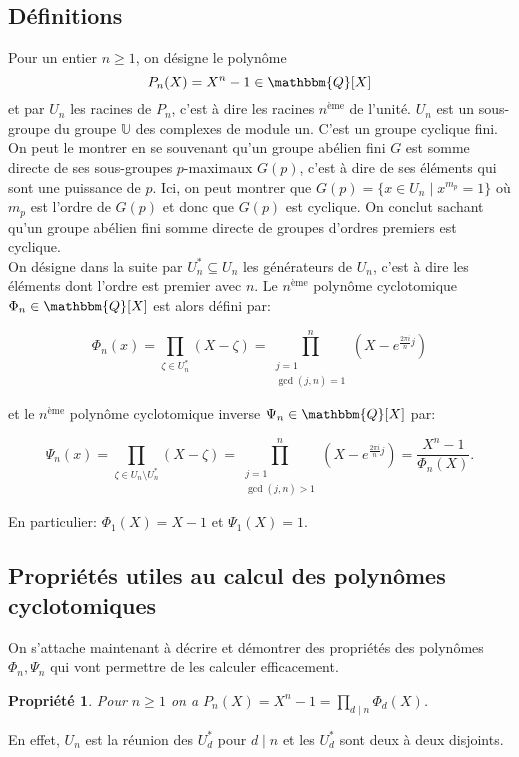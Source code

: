 \documentclass{article}
\newcommand{\Q}{\mathbbm{Q}}
\theoremstyle{break}                  %
\newtheorem{propriete}{Propriété}
\begin{document}
\subsection*{Définitions}
Pour un entier $n \ge 1$, on désigne le polynôme $$P_n(X) = X^n - 1 \in \Q[X]$$ et par $U_n$ les racines de $P_n$, c'est à dire les racines $n^{\text{ème}}$ de l'unité. $U_n$ est un sous-groupe du groupe $\mathbb U$ des complexes de module un. C'est un groupe cyclique fini. On peut le montrer en se souvenant qu'un groupe abélien fini $G$ est somme directe de ses sous-groupes $p$-maximaux $G(p)$, c'est à dire de ses éléments qui sont une puissance de $p$. Ici, on peut montrer que $G(p) = \{x \in U_n \mid x^{m_p} = 1\}$ où $m_p$ est l'ordre de $G(p)$ et donc que $G(p)$ est cyclique. On conclut sachant qu'un groupe abélien fini somme directe de groupes d'ordres premiers est cyclique.\\


On désigne dans la suite par $U_n^* \subseteq U_n$ les générateurs de $U_n$, c'est à dire les éléments dont l'ordre est premier avec $n$. Le $n^{\text{ème}}$ polynôme cyclotomique $\Phi_n \in \Q[X]$ est alors défini par:

$$\Phi_n(x) = \prod_{\zeta \in U^*_n} (X - \zeta) = \prod_{\substack{j=1\\ \gcd(j,n)=1}}^n (X - e^{\frac{2 \pi i}{n}j})$$

et le $n^{\text{ème}}$ polynôme cyclotomique inverse $\Psi_n \in \Q[X]$ par:

$$\Psi_n(x) = \prod_{\zeta \in U_n \setminus U^*_n} (X - \zeta) = \prod_{\substack{j=1\\ \gcd(j,n) > 1}}^n (X - e^{\frac{2 \pi i}{n}j}) = \frac{X^n - 1}{\Phi_n(X)}.$$

En particulier: $\Phi_1(X) = X-1$ et $\Psi_1(X) = 1$.

\subsection*{Propriétés utiles au calcul des polynômes cyclotomiques}
On s'attache maintenant à décrire et démontrer des propriétés des polynômes $\Phi_n, \Psi_n$ qui vont permettre de les calculer efficacement. 

\begin{propriete}
	Pour $n \ge 1$ on a $P_n(X) = X^n-1 = \prod_{ d \mid n} \Phi_d(X)$.
\end{propriete}
En effet, $U_n$ est la réunion des $U_d^*$ pour $d \mid n$ et les $U_d^*$ sont deux à deux disjoints.
\end{document}
